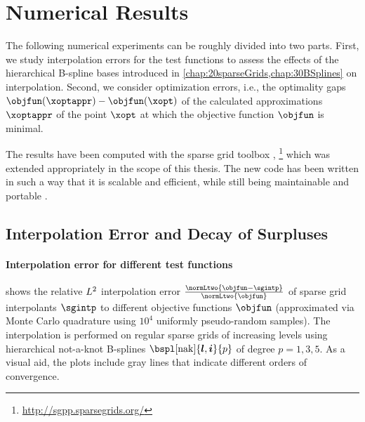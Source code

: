 \section{Numerical Results}
\label{sec:54results}


\noindent
The following numerical experiments can be roughly divided into two parts.
First, we study interpolation errors for the test functions
to assess the effects of the hierarchical B-spline bases introduced in
\cref{chap:20sparseGrids,chap:30BSplines} on interpolation.
Second, we consider optimization errors, i.e.,
the optimality gaps $\objfun(\xoptappr) - \objfun(\xopt)$
of the calculated approximations $\xoptappr$
of the point $\xopt$ at which the objective function $\objfun$
is minimal.

\pagebreak

The results have been computed with the sparse grid toolbox \sgpp
\cite{Pflueger10Spatially},%
\footnote{%
  \url{http://sgpp.sparsegrids.org/}%
}
which was extended appropriately in the scope of this thesis.
The new code has been written in such a way that
it is scalable and efficient, while still being maintainable and
portable \cite{Pflueger16Scalability}.



\subsection{Interpolation Error and Decay of Surpluses}
\label{sec:541interpolation}

\paragraph{Interpolation error for different test functions}

 shows the
relative $L^2$ interpolation error
$\tfrac{\normLtwo{\objfun - \sgintp}}{\normLtwo{\objfun}}$
of sparse grid interpolants $\sgintp$ to
different objective functions $\objfun$
(approximated via Monte Carlo quadrature using
$10^4$ uniformly pseudo-random samples).
The interpolation is performed on regular sparse grids of increasing levels
using hierarchical not-a-knot B-splines $\bspl[\nak]{\*l,\*i}{p}$
of degree $p = 1, 3, 5$.
As a visual aid, the plots include gray lines that indicate different
orders of convergence.

